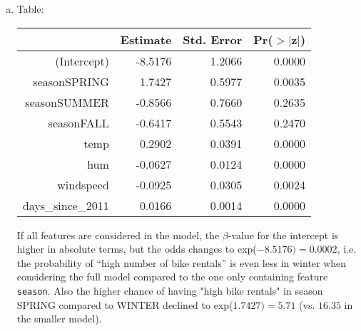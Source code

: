 {\begin{enumerate}[a)]
	The intercept gives the odds for ``high number of bike rentals'' vs. ``low to medium number of bike rentals'' in winter: exp$(-3.2131) = 0.04$. Interpretation as in a).
	
	Regarding the estimate of seasonSPRING: $\text{odds ratio (when season changes from winter to spring)} = \text{exp}(2.7941) =  16.35$. Interpretation as in b).
	\item Table:
	
	\begin{table}[ht]
		\centering
		\begin{tabular}{rrrr}
			\hline
			& Estimate & Std. Error & Pr($>$$|$z$|$) \\ 
			\hline
			(Intercept) & -8.5176 & 1.2066 & 0.0000 \\ 
			seasonSPRING & 1.7427 & 0.5977 & 0.0035 \\ 
			seasonSUMMER & -0.8566 & 0.7660 & 0.2635 \\ 
			seasonFALL & -0.6417 & 0.5543 & 0.2470 \\ 
			temp & 0.2902 & 0.0391 & 0.0000 \\ 
			hum & -0.0627 & 0.0124 & 0.0000 \\ 
			windspeed & -0.0925 & 0.0305 & 0.0024 \\ 
			days\_since\_2011 & 0.0166 & 0.0014 & 0.0000 \\ 
			\hline
		\end{tabular}
	\end{table}
	
	If all features are considered in the model, the $\beta$-value for the intercept is higher in absolute terms, but the odds changes to exp($-8.5176) = 0.0002$, i.e. the probability of ``high number of bike rentals'' is even less in winter when considering the full model compared to the one only containing feature \texttt{season}. Also the higher chance of having "high bike rentals" in season SPRING compared to WINTER declined to exp($1.7427)=5.71$ (vs. $16.35$ in the smaller model).
\end{enumerate}
}
